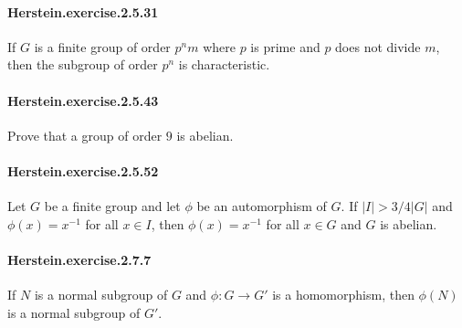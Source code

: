 \documentclass{article}
\begin{document}
\paragraph{Herstein.exercise.2.5.31} If $G$ is a finite group of order $p^nm$ where $p$ is prime and $p$ does not divide $m$, then the subgroup of order $p^n$ is characteristic.

\paragraph{Herstein.exercise.2.5.43} Prove that a group of order $9$ is abelian.

\paragraph{Herstein.exercise.2.5.52} Let $G$ be a finite group and let $\phi$ be an automorphism of $G$. If $|I|>3/4|G|$ and $\phi(x)=x^{-1}$ for all $x\in I$, then $\phi(x)=x^{-1}$ for all $x\in G$ and $G$ is abelian.

\paragraph{Herstein.exercise.2.7.7} If $N$ is a normal subgroup of $G$ and $\phi:G\to G'$ is a homomorphism, then $\phi(N)$ is a normal subgroup of $G'$.
\end{document}

